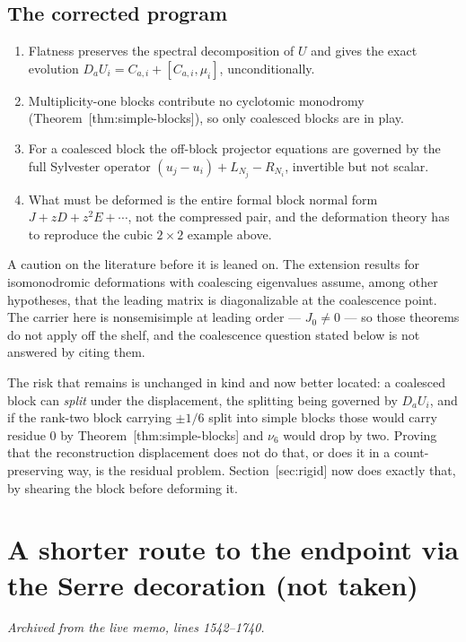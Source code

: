 \documentclass[11pt]{article}
\theoremstyle{definition}
\theoremstyle{remark}
\begin{document}
\subsection*{The corrected program}

\begin{enumerate}
\item Flatness preserves the spectral decomposition of $U$ and gives the exact
  evolution $D_aU_i=C_{a,i}+[C_{a,i},\mu_i]$, unconditionally.
\item Multiplicity-one blocks contribute no cyclotomic monodromy
  (Theorem~\textup{[thm:simple-blocks]}), so only coalesced blocks are in play.
\item For a coalesced block the off-block projector equations are governed by the
  full Sylvester operator $(u_j-u_i)+L_{N_j}-R_{N_i}$, invertible but not scalar.
\item What must be deformed is the entire formal block normal form
  $J+zD+z^2E+\cdots$, not the compressed pair, and the deformation theory has to
  reproduce the cubic $2\times2$ example above.
\end{enumerate}

A caution on the literature before it is leaned on. The extension results for
isomonodromic deformations with coalescing eigenvalues assume, among other
hypotheses, that the leading matrix is diagonalizable at the coalescence point.
The carrier here is nonsemisimple at leading order --- $J_0\ne0$ --- so those
theorems do not apply off the shelf, and the coalescence question stated below
is not answered by citing them.

The risk that remains is unchanged in kind and now better located: a coalesced
block can \emph{split} under the displacement, the splitting being governed by
$D_aU_i$, and if the rank-two block carrying $\pm1/6$ split into simple blocks
those would carry residue $0$ by Theorem~\textup{[thm:simple-blocks]} and $\nu_6$
would drop by two. Proving that the reconstruction displacement does not do
that, or does it in a count-preserving way, is the residual problem.
Section~\textup{[sec:rigid]} now does exactly that, by shearing the block before
deforming it.


\section{A shorter route to the endpoint via the Serre decoration (not taken)}
\noindent\emph{Archived from the live memo, lines 1542--1740.}
\end{document}
